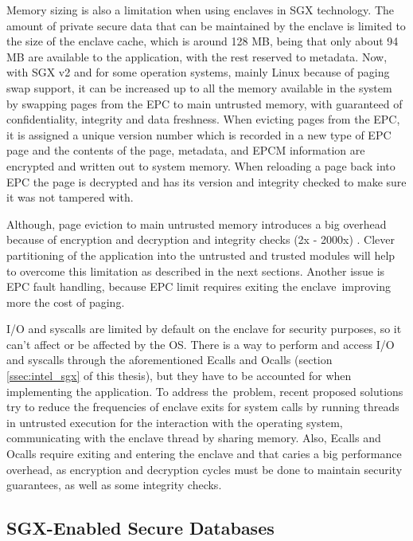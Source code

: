 Memory sizing is also a limitation when using enclaves in \gls{SGX} technology. The amount of private secure data that can be maintained by the enclave is limited to the size of the enclave cache, which is around 128 \gls{MB}, being that only about 94 \gls{MB} are available to the application, with the rest reserved to metadata. Now, with \gls{SGX} v2 and for some operation systems, mainly Linux because of paging swap support, it can be increased up to all the memory available in the system \cite{sgx:1} by swapping pages from the \gls{EPC} to main untrusted memory, with guaranteed of confidentiality, integrity and data freshness. When evicting pages from the \gls{EPC}, it is assigned a unique version number which is recorded in a new type of \gls{EPC} page and the contents of the page, metadata, and \gls{EPCM} information are encrypted and written out to system memory. When reloading a page back into \gls{EPC} the page is decrypted and has its version and integrity checked to make sure it was not tampered with.

Although, page eviction to main untrusted memory introduces a big overhead because of encryption and decryption and integrity checks (2x - 2000x) \cite{scone:1}. Clever partitioning of the application into the untrusted and trusted modules will help to overcome this limitation as described in the next sections. Another issue is \gls{EPC} fault handling, because \gls{EPC} limit requires exiting the enclave improving more the cost of paging.

\gls{I/O} and \glspl{syscall} are limited by default on the enclave for security purposes, so it can't affect or be affected by the \gls{OS}. There is a way to perform and access \gls{I/O} and \glspl{syscall} through the aforementioned \glspl{Ecall} and \glspl{Ocall} (section \ref{ssec:intel_sgx} of this thesis), but they have to be accounted for when implementing the application. To address the problem, recent proposed solutions try to reduce the frequencies of enclave exits for system calls by running threads in untrusted execution for the interaction with the operating system, communicating with the enclave thread by sharing memory. Also, \glspl{Ecall} and \glspl{Ocall} require exiting and entering the enclave and that caries a big performance overhead, as encryption and decryption cycles must be done to maintain security guarantees, as well as some integrity checks.

\subsection{SGX-Enabled Secure Databases}
\label{ssec:sgx_enabled_secure_databases}

